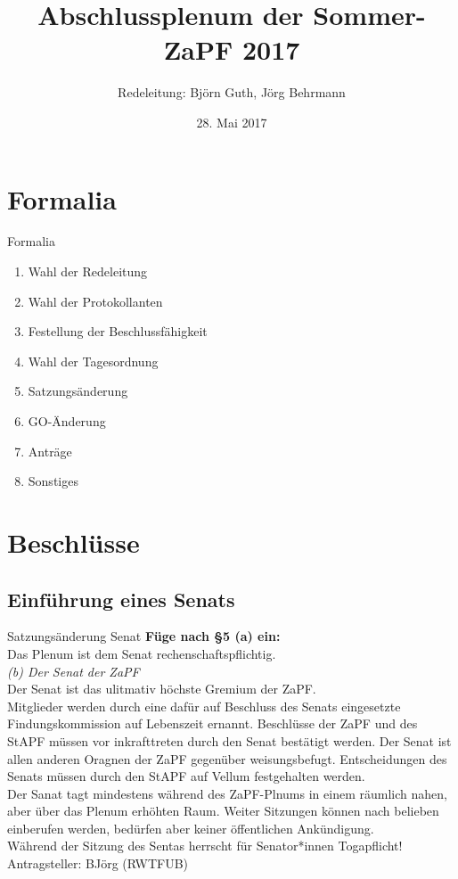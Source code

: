 \documentclass[compress,aspectratio=169]{beamer}
\title[Abschlussplenum SoSe17]{Abschlussplenum der Sommer-ZaPF 2017}
\author{Redeleitung: Björn Guth, Jörg Behrmann}
\institute[Zusammenkunft aller Physikfachschaften]
\date{28. Mai 2017}
\begin{document}
\begin{frame}[plain]{}
  \titlepage
\end{frame}

\section{Formalia}
\begin{frame}{Formalia}
	\begin{enumerate}
		\item Wahl der Redeleitung
		\item Wahl der Protokollanten
		\item Festellung der Beschlussfähigkeit
		\item Wahl der Tagesordnung
		\item Satzungsänderung
		\item GO-Änderung
		\item Anträge
		\item Sonstiges
	\end{enumerate}
\end{frame}

\section{Beschlüsse}
\subsection{Einführung eines Senats}
\begin{frame}{Satzungsänderung Senat}
	\textbf{Füge nach §5 (a) ein:}\\
	Das Plenum ist dem Senat rechenschaftspflichtig.\\
	\textit{(b) Der Senat der ZaPF}\\
	Der Senat ist das ulitmativ höchste Gremium der ZaPF.\\
	Mitglieder werden durch eine dafür auf Beschluss des Senats eingesetzte
	Findungskommission auf Lebenszeit ernannt. Beschlüsse der ZaPF und des
	StAPF müssen vor inkrafttreten durch den Senat bestätigt werden. Der Senat
	ist allen anderen Oragnen der ZaPF gegenüber weisungsbefugt.
	Entscheidungen des Senats müssen durch den StAPF auf Vellum festgehalten
	werden.\\
	Der Sanat tagt mindestens während des ZaPF-Plnums in einem räumlich nahen,
	aber über das Plenum erhöhten Raum. Weiter Sitzungen können nach belieben
	einberufen werden, bedürfen aber keiner öffentlichen Ankündigung.\\
	Während der Sitzung des Sentas herrscht für Senator*innen Togapflicht!
	\hfill Antragsteller: BJörg (RWTFUB)
\end{frame}
\end{document}
